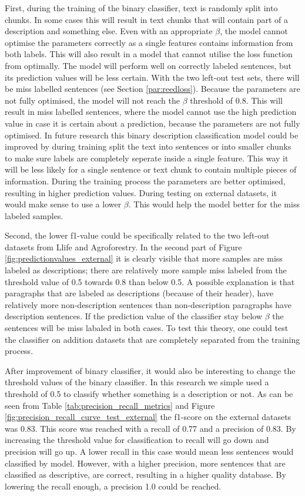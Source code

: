 \documentclass[a4paper, 12pt, oneside]{book} %
\begin{document}
First, during the training of the binary classifier, text is randomly split into chunks. 
In some cases this will result in text chunks that will contain part of a description and something else.
Even with an appropriate \(\beta\), the model cannot optimise the parameters correctly as a single features contains information from both labels.
This will also result in a model that cannot utilise the loss function from \textcite{reed_training_2015} optimally.
The model will perform well on correctly labeled sentences, but its prediction values will be less certain.
With the two left-out test sets, there will be miss labelled sentences (see Section \ref{par:reedloss}).
Because the parameters are not fully optimised, the model will not reach the \(\beta\) threshold of 0.8.
This will result in miss labelled sentences, where the model cannot use the high prediction value in case it is certain about a prediction, because the parameters are not fully optimised.
In future research this binary description classification model could be improved by during training split the text into sentences or into smaller chunks to make sure labels are completely seperate inside a single feature.
This way it will be less likely for a single sentence or text chunk to contain multiple pieces of information.
During the training process the parameters are better optimised, resulting in higher prediction values.
During testing on external datasets, it would make sense to use a lower \(\beta\).
This would help the model better for the miss labeled samples.

Second, the lower f1-value could be specifically related to the two left-out datasets from Llife and Agroforestry.
In the second part of Figure \ref{fig:predictionvalues_external} it is clearly visible that more samples are miss labeled as descriptions; there are relatively more sample miss labeled from the threshold value of 0.5 towards 0.8 than below 0.5.
A possible explanation is that paragraphs that are labeled as descriptions (because of their header), have relatively more non-description sentences than non-description paragraphs have description sentences.
If the prediction value of the classifier stay below \(\beta\) the sentences will be miss labaled in both cases.
To test this theory, one could test the classifier on addition datasets that are completely separated from the training process.

After improvement of binary classifier, it would also be interesting to change the threshold values of the binary classifier.
In this research we simple used a threshold of 0.5 to classify whether something is a description or not.
As can be seen from Table \ref{tab:precision_recall_metrics} and Figure \ref{fig:precision_recall_curve_test_external} the f1-score on the external datasets was 0.83. 
This score was reached with a recall of 0.77 and a precision of 0.83.
By increasing the threshold value for classification to recall will go down and precision will go up.
A lower recall in this case would mean less sentences would classified by model.
However, with a higher precision, more sentences that are classified as descriptive, are correct, resulting in a higher quality database.
By lowering the recall enough, a precision 1.0 could be reached.
\end{document}
